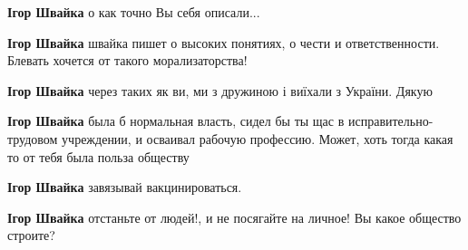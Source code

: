 \begin{itemize}
\begin{itemize}
\textbf{Ігор Швайка} о как точно Вы себя описали...

 
\textbf{Ігор Швайка} швайка пишет о высоких понятиях, о чести и ответственности. Блевать хочется от такого морализаторства!

 
\textbf{Ігор Швайка} через таких як ви, ми з дружиною і виїхали з України. Дякую

 
\textbf{Ігор Швайка} была б нормальная власть, сидел бы ты щас в
исправительно-трудовом учреждении, и осваивал рабочую профессию. Может, хоть
тогда какая то от тебя была польза обществу

 
\textbf{Ігор Швайка} завязывай вакцинироваться.

 
\textbf{Ігор Швайка} отстаньте от людей!, и не посягайте на личное! Вы какое общество строите?

 

\end{itemize}
\end{itemize}
